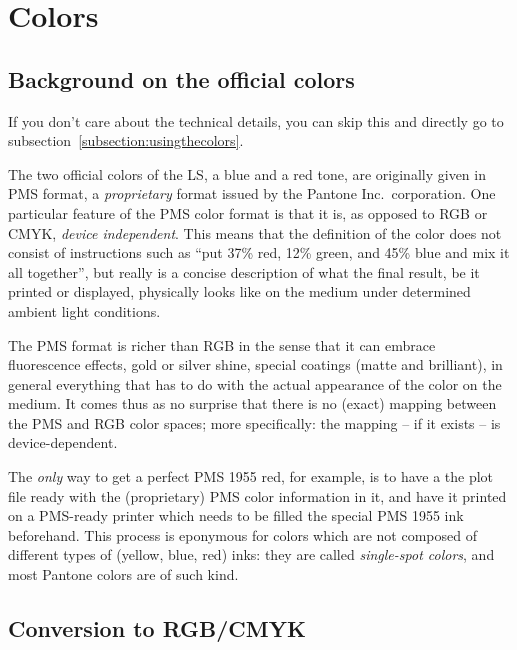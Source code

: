 \section{Colors}

\subsection{Background on the official colors}

\begin{note}
If you don't care about the technical details, you can skip this and directly
go to subsection~\ref{subsection:usingthecolors}.
\end{note}

The two official colors of the LS, a blue and a red tone, are originally given
in PMS format, a \emph{proprietary} format issued by the Pantone Inc.\
corporation. One particular feature of the PMS color format is that it is, as
opposed to RGB or CMYK, \emph{device independent}. This means that the
definition of the color does not consist of instructions such as \enquote{put
  37\% red, 12\% green, and 45\% blue and mix it all together}, but really is a
  concise description of what the final result, be it printed or displayed,
  physically looks like on the medium under determined ambient light
  conditions.

The PMS format is richer than RGB in the sense that it can embrace fluorescence
effects, gold or silver shine, special coatings (matte and brilliant), in
general everything that has to do with the actual appearance of the color on
the medium. It comes thus as no surprise that there is no (exact) mapping
between the PMS and RGB color spaces; more specifically: the mapping -- if it
exists -- is device-dependent.

The \emph{only} way to get a perfect PMS 1955 red, for example, is to have a
the plot file ready with the (proprietary) PMS color information in it, and
have it printed on a PMS-ready printer which needs to be filled the special PMS
1955 ink beforehand. This process is eponymous for colors which are not
composed of different types of (yellow, blue, red) inks: they are called
\emph{single-spot colors}, and most Pantone\textsuperscript{\textregistered}
colors are of such kind.


\subsection{Conversion to RGB/CMYK}

